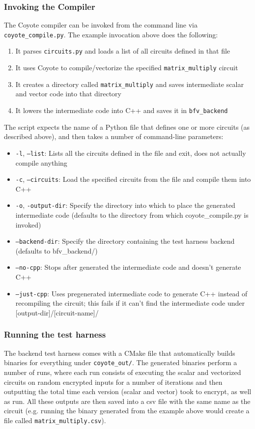 \subsubsection{Invoking the Compiler}
The Coyote compiler can be invoked from the command line via {\tt coyote\_compile.py}. The example invocation above does the following:
\begin{enumerate}
    \item It parses {\tt circuits.py} and loads a list of all circuits defined in that file
    \item It uses Coyote to compile/vectorize the specified {\tt matrix\_multiply} circuit
    \item It creates a directory called {\tt matrix\_multiply} and saves intermediate scalar and vector code into that directory
    \item It lowers the intermediate code into C++ and saves it in {\tt bfv\_backend}
\end{enumerate}
The script expects the name of a Python file that defines one or more circuits (as described above), and then takes a number of command-line parameters:
\begin{itemize}
    \item {\tt -l}, {\tt --list}: Lists all the circuits defined in the file and exit, does not actually compile anything
    \item {\tt -c}, {\tt --circuits}: Load the specified circuits from the file and compile them into C++
    \item {\tt -o}, {\tt -output-dir}: Specify the directory into which to place the generated intermediate code (defaults to the directory from which coyote\_compile.py is invoked)
    \item {\tt --backend-dir}: Specify the directory containing the test harness backend (defaults to bfv\_backend/)
    \item {\tt --no-cpp}: Stops after generated the intermediate code and doesn't generate C++
    \item {\tt --just-cpp}: Uses pregenerated intermediate code to generate C++ instead of recompiling the circuit; this fails if it can't find the intermediate code under [output-dir]/[circuit-name]/
\end{itemize}
\subsubsection{Running the test harness}
The backend test harness comes with a CMake file that automatically builds binaries for everything under {\tt coyote\_out/}. The generated binaries perform a number of runs, where each run consists of executing the scalar and vectorized circuits on random encrypted inputs for a number of iterations and then outputting the total time each version (scalar and vector) took to encrypt, as well as run. All these outputs are then saved into a csv file with the same name as the circuit (e.g. running the binary generated from the example above would create a file called {\tt matrix\_multiply.csv}).

